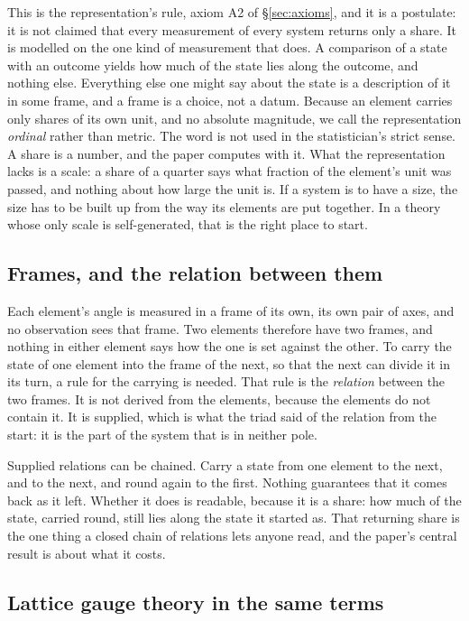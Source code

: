 \documentclass[11pt,a4paper]{article}
\theoremstyle{plain}
\theoremstyle{definition}
\theoremstyle{remark}
\begin{document}
This is the representation's rule, axiom A2 of \S\ref{sec:axioms}, and it is a postulate: it is not claimed that every measurement of every system returns only a share. It is modelled on the one kind of measurement that does. A comparison of a state with an outcome yields how much of the state lies along the outcome, and nothing else. Everything else one might say about the state is a description of it in some frame, and a frame is a choice, not a datum. Because an element carries only shares of its own unit, and no absolute magnitude, we call the representation \emph{ordinal} rather than metric. The word is not used in the statistician's strict sense. A share is a number, and the paper computes with it. What the representation lacks is a scale: a share of a quarter says what fraction of the element's unit was passed, and nothing about how large the unit is. If a system is to have a size, the size has to be built up from the way its elements are put together. In a theory whose only scale is self-generated, that is the right place to start.

\subsection{Frames, and the relation between them}

Each element's angle is measured in a frame of its own, its own pair of axes, and no observation sees that frame. Two elements therefore have two frames, and nothing in either element says how the one is set against the other. To carry the state of one element into the frame of the next, so that the next can divide it in its turn, a rule for the carrying is needed. That rule is the \emph{relation} between the two frames. It is not derived from the elements, because the elements do not contain it. It is supplied, which is what the triad said of the relation from the start: it is the part of the system that is in neither pole.

Supplied relations can be chained. Carry a state from one element to the next, and to the next, and round again to the first. Nothing guarantees that it comes back as it left. Whether it does is readable, because it is a share: how much of the state, carried round, still lies along the state it started as. That returning share is the one thing a closed chain of relations lets anyone read, and the paper's central result is about what it costs.

\subsection{Lattice gauge theory in the same terms}
\end{document}
